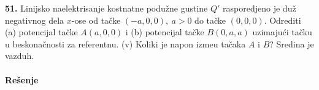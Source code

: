 \textbf{\Large 51.} Linijsko naelektrisanje kostnatne podu\v{z}ne gustine $Q'$ rasporedjeno je du\v{z} negativnog dela $x$-ose od ta\v{c}ke $(-a,0,0),\ a > 0$ do ta\v{c}ke $(0,0,0)$. Odrediti (a) potencijal ta\v{c}ke $A(a,0,0)$ i (b) potencijal ta\v{c}ke $B(0,a,a)$ uzimaju\'{c}i ta\v{c}ku u beskona\v{c}nosti za referentnu. (v) Koliki je napon izme\dj{}u ta\v{c}aka $A$ i $B$? Sredina je vazduh.
\\\\
\textbf{\Large Re\v{s}enje}\\
